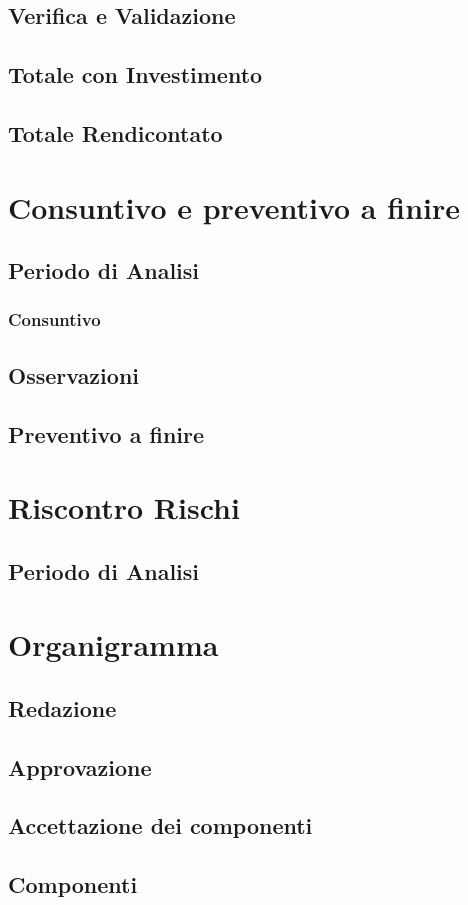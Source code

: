 \documentclass[a4paper, oneside, openany, dvipsnames, table]{article}
\begin{document}
	\subsection{Verifica e Validazione}
	    
	\newpage
	\subsection{Totale con Investimento}
	    
	\newpage
	\subsection{Totale Rendicontato}
	    	
\newpage
\section{Consuntivo e preventivo a finire}
	
	\subsection{Periodo di Analisi}
		
		\subsubsection{Consuntivo}
			
		\subsection{Osservazioni}
			
	\subsection{Preventivo a finire}
		
		
\appendix
{}

\newpage
\section{Riscontro Rischi}
	\label{app:riscontro}
	
	\subsection{Periodo di Analisi}
			

\newpage
\section{Organigramma}
	\subsection{Redazione}
		
	\subsection{Approvazione}
		
	\subsection{Accettazione dei componenti}
			
	\subsection{Componenti}
		
\end{document}
